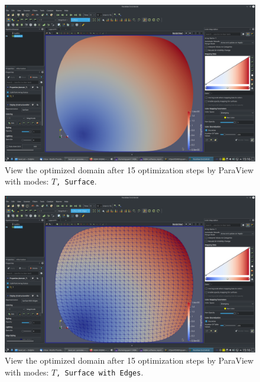 \documentclass[onsided]{book}
\numberwithin{equation}{section}
\begin{document}
\begin{enumerate}
\begin{enumerate}
        \begin{figure}[H]
            \centering
            \includegraphics[height=0.44\textheight]{level_set_optimized_domain_after_15_steps_T_Surface}
            \caption{View the optimized domain after 15 optimization steps by ParaView with modes: \texttt{$T$, Surface}.}
        \end{figure}
        
        \begin{figure}[H]
            \centering
            \includegraphics[height=0.44\textheight]{level_set_optimized_domain_after_15_steps_T_Surface_with_Edges}
            \caption{View the optimized domain after 15 optimization steps by ParaView with modes: \texttt{$T$, Surface with Edges}.}
        \end{figure}
        

\end{enumerate}
\end{enumerate}
\end{document}
